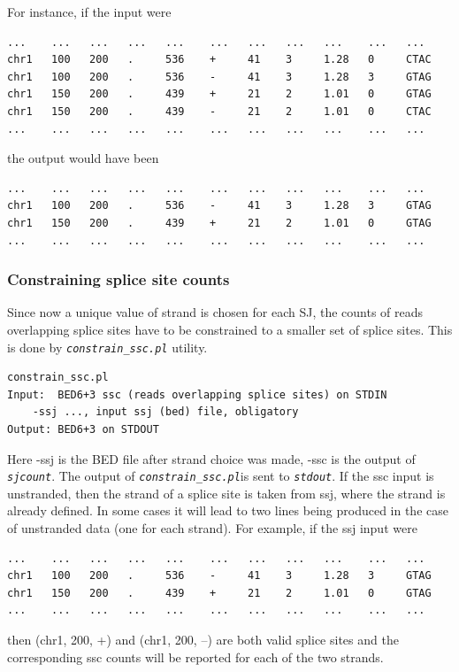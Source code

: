 \documentclass{article}
\newcommand{\prog}[1]{{\tt\em #1}}
\begin{document}
For instance, if the input were
\begin{verbatim}
...    ...   ...   ...   ...    ...   ...   ...   ...    ...   ...
chr1   100   200   .     536    +     41    3     1.28   0     CTAC
chr1   100   200   .     536    -     41    3     1.28   3     GTAG
chr1   150   200   .     439    +     21    2     1.01   0     GTAG
chr1   150   200   .     439    -     21    2     1.01   0     CTAC
...    ...   ...   ...   ...    ...   ...   ...   ...    ...   ...
\end{verbatim}
the output would have been 
\begin{verbatim}
...    ...   ...   ...   ...    ...   ...   ...   ...    ...   ...
chr1   100   200   .     536    -     41    3     1.28   3     GTAG
chr1   150   200   .     439    +     21    2     1.01   0     GTAG
...    ...   ...   ...   ...    ...   ...   ...   ...    ...   ...
\end{verbatim}


\subsubsection{Constraining splice site counts}
Since now a unique value of strand is chosen for each SJ, the counts of reads overlapping splice sites have to be constrained to a smaller set of splice sites.
This is done by \prog{constrain\_ssc.pl} utility.
\begin{verbatim}
constrain_ssc.pl
Input:  BED6+3 ssc (reads overlapping splice sites) on STDIN
	-ssj ..., input ssj (bed) file, obligatory
Output: BED6+3 on STDOUT
\end{verbatim}
Here -ssj is the BED file after strand choice was made, -ssc is the output of \prog{sjcount}. The output of \prog{constrain\_ssc.pl}is sent to \prog{stdout}. 
If the ssc input is unstranded, then the strand of a splice site is taken from ssj, where the strand is already defined. In some cases it will lead to two 
lines being produced in the case of unstranded data (one for each strand). For example, if the ssj input were
\begin{verbatim}
...    ...   ...   ...   ...    ...   ...   ...   ...    ...   ...
chr1   100   200   .     536    -     41    3     1.28   3     GTAG
chr1   150   200   .     439    +     21    2     1.01   0     GTAG
...    ...   ...   ...   ...    ...   ...   ...   ...    ...   ...
\end{verbatim}
then (chr1, 200, +) and (chr1, 200, --) are both valid splice sites and the corresponding ssc counts will be reported for each of the two strands.
\end{document}
